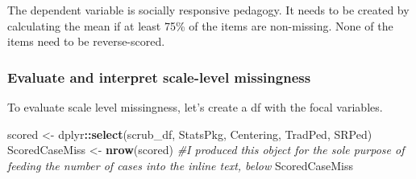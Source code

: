 \documentclass[
  11pt,
]{book}
\newenvironment{Shaded}{\begin{snugshade}}{\end{snugshade}}
\newcommand{\CommentTok}[1]{\textcolor[rgb]{0.37,0.37,0.37}{\textit{#1}}}
\newcommand{\FloatTok}[1]{\textcolor[rgb]{0.06,0.06,0.06}{#1}}
\newcommand{\FunctionTok}[1]{\textcolor[rgb]{0.27,0.27,0.27}{\textbf{#1}}}
\newcommand{\NormalTok}[1]{#1}
\newcommand{\OtherTok}[1]{\textcolor[rgb]{0.37,0.37,0.37}{#1}}
\newcommand{\SpecialCharTok}[1]{\textcolor[rgb]{0.43,0.43,0.43}{\textbf{#1}}}
\newcommand{\StringTok}[1]{\textcolor[rgb]{0.5,0.5,0.5}{#1}}
\begin{document}
The dependent variable is socially responsive pedagogy. It needs to be created by calculating the mean if at least 75\% of the items are non-missing. None of the items need to be reverse-scored.

\begin{Shaded}
\end{Shaded}

\hypertarget{evaluate-and-interpret-scale-level-missingness}{%
\subsubsection*{Evaluate and interpret scale-level missingness}\label{evaluate-and-interpret-scale-level-missingness}}


To evaluate scale level missingness, let's create a df with the focal variables.

\begin{Shaded}
\begin{Highlighting}[]
\NormalTok{scored }\OtherTok{\textless{}{-}}\NormalTok{ dplyr}\SpecialCharTok{::}\FunctionTok{select}\NormalTok{(scrub\_df, StatsPkg, Centering, TradPed, SRPed)}
\NormalTok{ScoredCaseMiss }\OtherTok{\textless{}{-}} \FunctionTok{nrow}\NormalTok{(scored)  }\CommentTok{\#I produced this object for the sole purpose of feeding the number of cases into the inline text, below}
\NormalTok{ScoredCaseMiss}
\end{Highlighting}
\end{Shaded}
\end{document}
